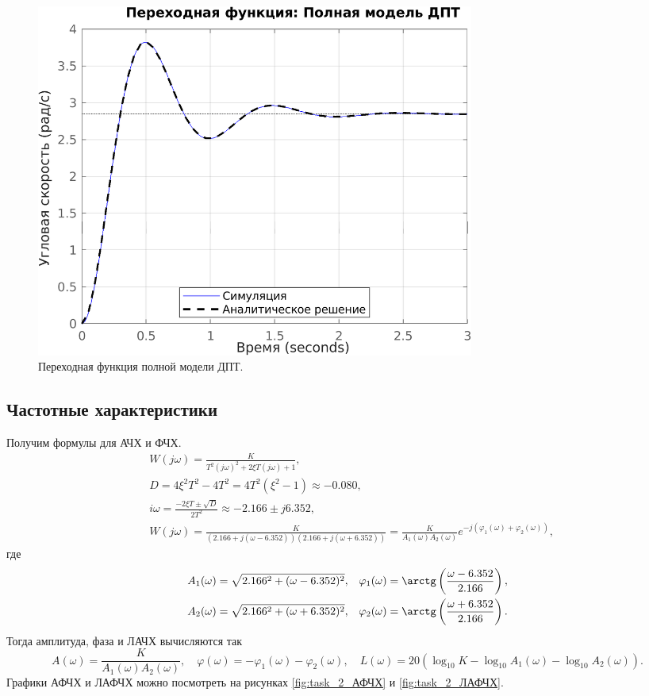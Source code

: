\begin{figure}[htbp]
    \centering
    \includegraphics[width=0.7\textwidth]{figs/task_2_step.png}
    \caption{Переходная функция полной модели ДПТ.}
    \label{fig:task_2_step}
\end{figure}


\subsection{Частотные характеристики}

Получим формулы для АЧХ и ФЧХ.
\begin{equation*}
    \begin{split}
        &W(j\omega)=\frac{K}{T^2(j\omega)^2+2\xi T (j\omega)+1},\\
        &D=4\xi^2T^2-4T^2=4T^2(\xi^2-1)\approx-0.080,\\
        &i\omega=\frac{-2\xi T\pm\sqrt{D}}{2T^2}\approx-2.166\pm j6.352,\\
        &W(j\omega)=\frac{K}{(2.166+j(\omega-6.352))(2.166+j(\omega+6.352))}=\frac{K}{A_1(\omega)A_2(\omega)}e^{-j(\varphi_1(\omega)+\varphi_2(\omega))},
    \end{split}
\end{equation*}
где 
\begin{equation*}
    \begin{aligned}
        A_1(\omega)=\sqrt{2.166^2+(\omega-6.352)^2},&\quad \varphi_1(\omega)=\arctg\left(\frac{\omega-6.352}{2.166}\right),\\
        A_2(\omega)=\sqrt{2.166^2+(\omega+6.352)^2},&\quad \varphi_2(\omega)=\arctg\left(\frac{\omega+6.352}{2.166}\right).
    \end{aligned}
\end{equation*}
Тогда амплитуда, фаза и ЛАЧХ вычисляются так
\begin{equation*}
    A(\omega)=\frac{K}{A_1(\omega)A_2(\omega)},\quad \varphi(\omega)=-\varphi_1(\omega)-\varphi_2(\omega),\quad L(\omega)=20(\log_{10}K-\log_{10}A_1(\omega)-\log_{10}A_2(\omega)).
\end{equation*}
Графики АФЧХ и ЛАФЧХ можно посмотреть на рисунках \ref{fig:task_2_АФЧХ} и \ref{fig:task_2_ЛАФЧХ}.

